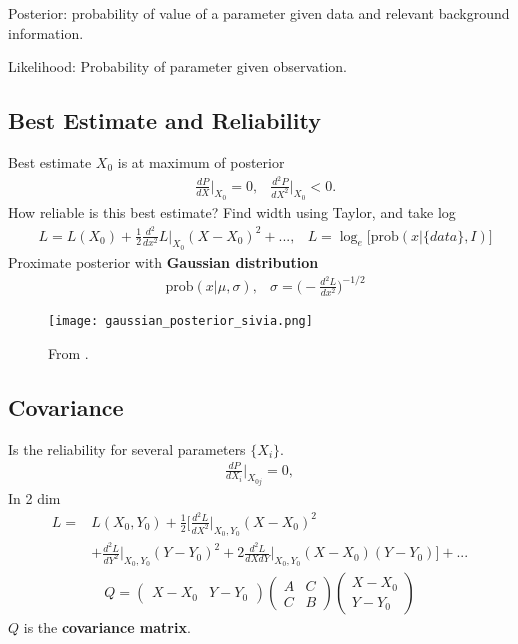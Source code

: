 \documentclass[twoside,english]{uiofysmaster}
\begin{document}
Posterior: probability of value of a parameter given data and relevant background information.

Likelihood: Probability of parameter given observation.

\subsection{Best Estimate and Reliability}

Best estimate $X_0$ is at maximum of posterior
\begin{align}
&\frac{dP}{dX}\Big|_{X_0} = 0, &\frac{d^2P}{dX^2}\Big|_{X_0} < 0.
\end{align}
How reliable is this best estimate? Find width using Taylor, and take log
\begin{align}
&L = L(X_0) + \frac{1}{2} \frac{d^2}{dx^2} L\Big|_{X_0} (X-X_0)^2 +... ,&L = \log_e \Big[\text{prob}(x | \{data\}, I) \Big]
\end{align}
Proximate posterior with \textbf{Gaussian distribution}
\begin{align}
&\text{prob}(x| \mu, \sigma), &\sigma = \Big( - \frac{d^2L}{dx^2} \Big)^{-1/2}
\end{align}

\begin{figure}
\centering
\texttt{[image: gaussian\_posterior\_sivia.png]}
\caption{From \cite{sivia2006data}.}
\end{figure}

\subsection{Covariance}

Is the reliability for several parameters $\{ X_i \}$. 
\begin{align}
\frac{dP}{dX_i} \Big|_{X_{0j}} =0,
\end{align}
In 2 dim
\begin{align}
L =& L(X_0, Y_0) + \frac{1}{2} \Big[ \frac{d^2L}{dX^2}  \Big|_{X_0, Y_0}(X-X_0)^2\\
& + \frac{d^2L}{dY^2}  \Big|_{X_0, Y_0}(Y-Y_0)^2 + 2 \frac{d^2L}{dXdY}  \Big|_{X_0, Y_0}(X-X_0)(Y-Y_0) \Big] +...
\end{align}
\begin{align}
Q = 
\begin{pmatrix}
X-X_0 & Y -Y_0
\end{pmatrix}
\begin{pmatrix}
A & C\\
C & B
\end{pmatrix}
\begin{pmatrix}
X -X_0\\
Y-Y_0
\end{pmatrix}
\end{align}
$Q$ is the \textbf{covariance matrix}.
\end{document}
